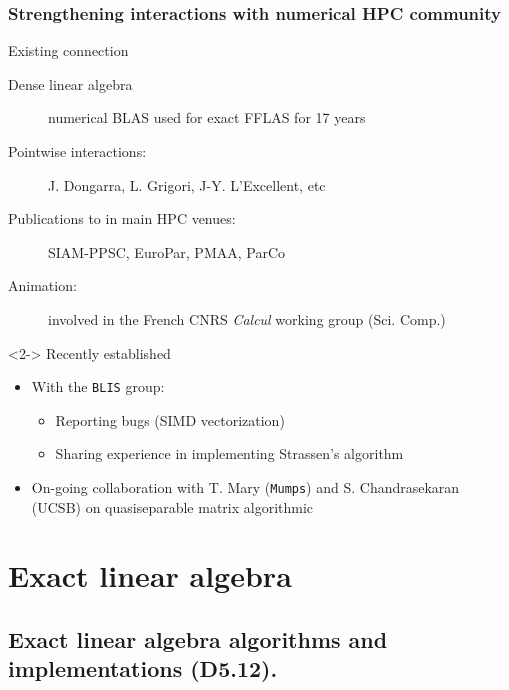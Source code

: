 \documentclass{beamer}
\begin{document}
\begin{frame}
  \frametitle{Strengthening interactions with numerical HPC community}
  \begin{block}  {Existing connection}
    \begin{description}
    \item[Dense linear algebra] numerical BLAS used for exact FFLAS for 17 years
    \item[Pointwise interactions:] J. Dongarra, L. Grigori, J-Y. L'Excellent,  etc
    \item[Publications to in main HPC venues:]
      SIAM-PPSC, EuroPar, PMAA, ParCo
    \item[Animation:] involved in the French CNRS \textit{Calcul}  working group (Sci. Comp.)
    \end{description}
  \end{block}
  \begin{block}<2->  {Recently established}
    \begin{itemize}
    \item With the \texttt{BLIS} group:
      \begin{itemize}
      \item Reporting bugs (SIMD vectorization)
      \item Sharing experience in implementing Strassen's algorithm
      \end{itemize}
    \item On-going collaboration with T. Mary (\texttt{Mumps}) and
        S. Chandrasekaran (UCSB) on quasiseparable matrix algorithmic
    \end{itemize}
  \end{block}
\end{frame}

\section{Exact linear algebra}
\subsection{Exact linear algebra algorithms and implementations (D5.12).}
\end{document}
